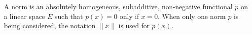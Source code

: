 A norm is an absolutely homogeneous, subadditive, non-negative functional $p$ on a linear space $E$ such that $p(x) = 0$ only if $x = 0$. When only one norm $p$ is being considered, the notation $\|x\|$ is used for $p(x)$.
